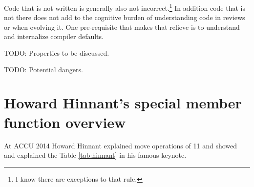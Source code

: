 \documentclass[ebook,11pt,article]{memoir}
\begin{document}
Code that is not written is generally also not incorrect.\footnote{I know there are exceptions to that rule.}
In addition code that is not there does not add to the cognitive burden of understanding code in reviews or when evolving it. One pre-requisite that makes that relieve is to understand and internalize compiler defaults.


TODO: Properties to be discussed. 

TODO: Potential dangers.

\section{Howard Hinnant's special member function overview}
At ACCU 2014 Howard Hinnant \cite{ACCU2014} explained move operations of \Cpp{}11 and showed and explained the Table \ref{tab:hinnant} in his famous keynote.
\end{document}
